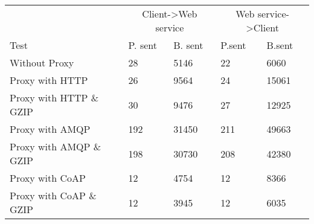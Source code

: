 \begin{tabularx}{\textwidth}{lXXXX}
\hline
\multicolumn{1}{l}{}                  & \multicolumn{2}{c}{Client->Web service}                           & \multicolumn{2}{c}{Web service->Client}                           \\
\multicolumn{1}{l}{Test} & \multicolumn{1}{l}{P. sent} & \multicolumn{1}{l}{B. sent} & \multicolumn{1}{l}{P.sent} & \multicolumn{1}{l}{B.sent} \\ \hline
Without Proxy                   & 28             & 5146           & 22             & 6060           \\
Proxy with HTTP                 & 26             & 9564           & 24             & 15061          \\
Proxy with HTTP \& GZIP         & 30             & 9476           & 27             & 12925          \\
Proxy with AMQP                 & 192            & 31450          & 211            & 49663          \\
Proxy with AMQP \& GZIP         & 198            & 30730          & 208            & 42380          \\
Proxy with CoAP                 & 12             & 4754           & 12             & 8366           \\
Proxy with CoAP \& GZIP         & 12             & 3945           & 12             & 6035           \\
\end{tabularx}

